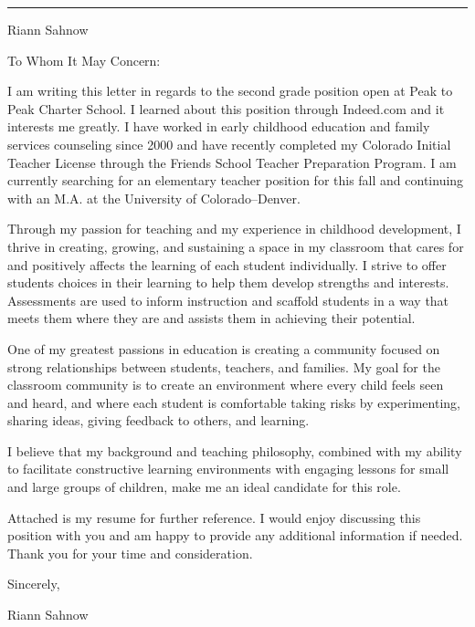 \documentclass[letterpaper,10pt]{article}
\newcommand{\mblue}{\color{darkblue}}
\begin{document}
\pagestyle{empty}

{\mblue\rule{4.63in}{0.08cm}}

\vspace{-1.0pc}
\hfill{\Huge\mblue Riann Sahnow}

\vspace{2pc}
To Whom It May Concern:

\bigbreak\qquad I am writing this letter in regards to the second grade
position open at Peak to Peak Charter School. I learned about this position through
Indeed.com and it interests me greatly. I have worked in early childhood
education and family services counseling since 2000 and have recently completed
my Colorado Initial Teacher License through the Friends School Teacher Preparation
Program. I am currently searching for an elementary teacher position
for this fall and continuing with an M.A. at the University of Colorado--Denver.

\bigbreak\qquad Through my passion for teaching and my experience in
childhood development, I thrive in creating, growing, and sustaining a space in
my classroom that cares for and positively affects the learning of each student
individually. I strive to offer students choices in their learning to help them
develop strengths and interests. Assessments are used to inform instruction and
scaffold students in a way that meets them where they are and assists them in
achieving their potential.

\bigbreak\qquad One of my greatest passions in education is creating
a community focused on strong relationships between students, teachers, and
families. My goal for the classroom community is to create an environment
where every child feels seen and heard, and where each student is comfortable
taking risks by experimenting, sharing ideas, giving feedback to others, and learning.

\bigbreak\qquad I believe that my background and teaching philosophy, combined
with my ability to facilitate constructive learning environments with engaging
lessons for small and large groups of children, make me an ideal candidate for
this role.

\bigbreak\qquad Attached is my resume for further reference. I would enjoy
discussing this position with you and am happy to provide any additional
information if needed. Thank you for your time and consideration.

\bigbreak Sincerely,

\vspace{2pc} Riann Sahnow
\end{document}

